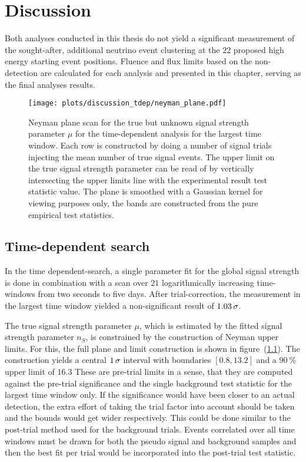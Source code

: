 \chapter{Discussion}

Both analyses conducted in this thesis do not yield a significant measurement of the sought-after, additional neutrino event clustering at the $\num{22}$ proposed high energy starting event positions.
Fluence and flux limits based on the non-detection are calculated for each analysis and presented in this chapter, serving as the final analyses results.

\begin{figure}[htpb]
  \centering
  \texttt{[image: plots/discussion\_tdep/neyman\_plane.pdf]}
  \caption[Neyman plane for the time-dependent analysis]{
    Neyman plane scan for the true but unknown signal strength parameter $\mu$ for the time-dependent analysis for the largest time window.
    Each row is constructed by doing a number of signal trials injecting the mean number of true signal events.
    The upper limit on the true signal strength parameter can be read of by vertically intersecting the upper limits line with the experimental result test statistic value.
    The plane is smoothed with a Gaussian kernel for viewing purposes only, the bands are constructed from the pure empirical test statistics.
  }
  \label{fig:tdep_neyman_plane}
\end{figure}

\section*{Time-dependent search}
In the time dependent-search, a single parameter fit for the global signal strength is done in combination with a scan over $\num{21}$ logarithmically increasing time-windows from two seconds to five days.
After trial-correction, the measurement in the largest time window yielded a non-significant result of $\num{1.03}\,\sigma$.

The true signal strength parameter $\mu$, which is estimated by the fitted signal strength parameter $n_S$, is constrained by the construction of Neyman upper limits.
For this, the full plane and limit construction is shown in figure~(\ref{fig:tdep_neyman_plane}).
The construction yields a central $\num{1}\,\sigma$ interval with boundaries $[0.8, 13.2]$ and a $\SI{90}{\percent}$ upper limit of $\num{16.3}$
These are pre-trial limits in a sense, that they are computed against the pre-trial significance and the single background test statistic for the largest time window only.
If the significance would have been closer to an actual detection, the extra effort of taking the trial factor into account should be taken and the bounds would get wider respectively.
This could be done similar to the post-trial method used for the background trials.
Events correlated over all time windows must be drawn for both the pseudo signal and background samples and then the best fit per trial would be incorporated into the post-trial test statistic.

